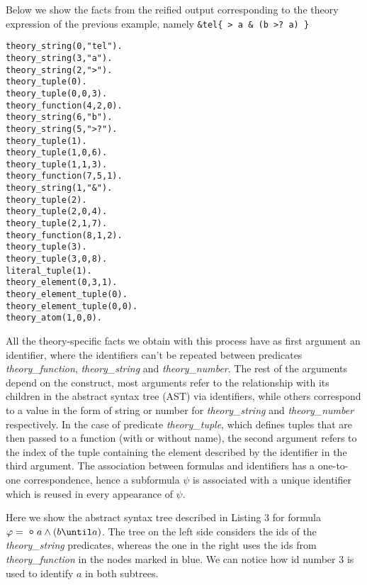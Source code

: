 \begin{example}
    Below we show the facts from the reified output corresponding to the theory expression of the previous example, namely \texttt{\&tel\{ > a \& (b >? a) \}}
    \begin{center}
        \begin{lstlisting}[] 
theory_string(0,"tel").
theory_string(3,"a").
theory_string(2,">").
theory_tuple(0).
theory_tuple(0,0,3).
theory_function(4,2,0).
theory_string(6,"b").
theory_string(5,">?").
theory_tuple(1).
theory_tuple(1,0,6).
theory_tuple(1,1,3).
theory_function(7,5,1).
theory_string(1,"&").
theory_tuple(2).
theory_tuple(2,0,4).
theory_tuple(2,1,7).
theory_function(8,1,2).
theory_tuple(3).
theory_tuple(3,0,8).
literal_tuple(1).
theory_element(0,3,1).
theory_element_tuple(0).
theory_element_tuple(0,0).
theory_atom(1,0,0).
        \end{lstlisting}
    \end{center}
\end{example}

All the theory-specific facts we obtain with this process have as first argument an identifier, where the identifiers can't be repeated between predicates  \textit{theory\_function}, \textit{theory\_string} and \textit{theory\_number}. The rest of the arguments depend on the construct, most arguments refer to the relationship with its children in the abstract syntax tree (AST) via identifiers, while others correspond to a value in the form of string or number for \textit{theory\_string} and \textit{theory\_number} respectively. In the case of predicate \textit{theory\_tuple}, which defines tuples that are then passed to a function (with or without name), the second argument refers to the index of the tuple containing the element described by the identifier in the third argument. The association between formulas and identifiers has a one-to-one correspondence, hence a subformula $\psi$ is associated with a unique identifier which is reused in every appearance of $\psi$. 


\begin{example}
    Here we show the abstract syntax tree described in Listing 3 for formula $\varphi= \Next a \wedge (b \until a)$. The tree on the left side considers the ids of the \textit{theory\_string} predicates, whereas the one in the right uses the ids from \textit{theory\_function} in the nodes marked in blue. We can notice how id number $3$ is used to identify $a$ in both subtrees.
    \begin{multicols*}{2}
        
    

    


\end{multicols*}
\end{example}
